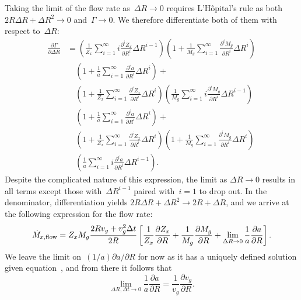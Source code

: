 \documentclass[main.tex]{subfiles}
\begin{document}
Taking the limit of the flow rate as~$\Delta R \rightarrow 0$ requires
L'H\^opital's rule as both $2 R \Delta R + \Delta R^2 \rightarrow 0$
and~$\Gamma \rightarrow 0$.
We therefore differentiate both of them with respect to~$\Delta R$:
\begin{equation}\begin{split}
\frac{\partial \Gamma}{\partial \Delta R} &=
\left(\frac{1}{Z_x} \sum_{i = 1}^\infty i
\frac{\partial^i Z_x}{\partial R^i} \Delta R^{i - 1}\right)
\left(1 + \frac{1}{M_g}
\sum_{i = 1}^\infty \frac{\partial^i M_g}{\partial R^i} \Delta R^i\right)
\\
&\quad
\left(1 + \frac{1}{a}
\sum_{i = 1}^\infty \frac{\partial^i a}{\partial R^i} \Delta R^i\right) +
\\
&\quad
\left(1 + \frac{1}{Z_x}
\sum_{i = 1}^\infty \frac{\partial^i Z_x}{\partial R^i} \Delta R^i\right)
\left(\frac{1}{M_g} \sum_{i = 1}^\infty i
\frac{\partial^i M_g}{\partial R^i} \Delta R^{i - 1}\right)
\\
&\quad
\left(1 + \frac{1}{a}
\sum_{i = 1}^\infty \frac{\partial^i a}{\partial R^i} \Delta R^i\right) +
\\
&\quad
\left(1 + \frac{1}{Z_x}
\sum_{i = 1}^\infty \frac{\partial^i Z_x}{\partial R^i} \Delta R^i\right)
\left(1 + \frac{1}{M_g}
\sum_{i = 1}^\infty \frac{\partial^i M_g}{\partial R^i} \Delta R^i\right)
\\
&\quad
\left(\frac{1}{a} \sum_{i = 1}^\infty i \frac{\partial^i a}{\partial R^i}
\Delta R^{i - 1}\right).
\end{split}\end{equation}
Despite the complicated nature of this expression, the limit as
$\Delta R \rightarrow 0$ results in all terms except those
with~$\Delta R^{i - 1}$ paired with~$i = 1$ to drop out.
In the denominator, differentiation yields
$2 R \Delta R + \Delta R^2 \rightarrow 2R + \Delta R$, and we arrive at the
following expression for the flow rate:
\begin{equation}
\dot{M}_{x,\text{flow}} = Z_x M_g \frac{2 R v_g + v_g^2 \Delta t}{2R} \left[
\frac{1}{Z_x} \frac{\partial Z_x}{\partial R} +
\frac{1}{M_g} \frac{\partial M_g}{\partial R} +
\lim_{\Delta R \rightarrow 0} \frac{1}{a} \frac{\partial a}{\partial R}
\right].
\label{outflows:eq:mdot-flow-limit}
\end{equation}
We leave the limit on~$(1 / a) \partial a / \partial R$ for now as it has a
uniquely defined solution given equation~, and
from there it follows that
\begin{equation}
\lim_{\Delta R, \Delta t \rightarrow 0} \frac{1}{a}
\frac{\partial a}{\partial R} = \frac{1}{v_g} \frac{\partial v_g}{\partial R}.
\end{equation}
\end{document}
